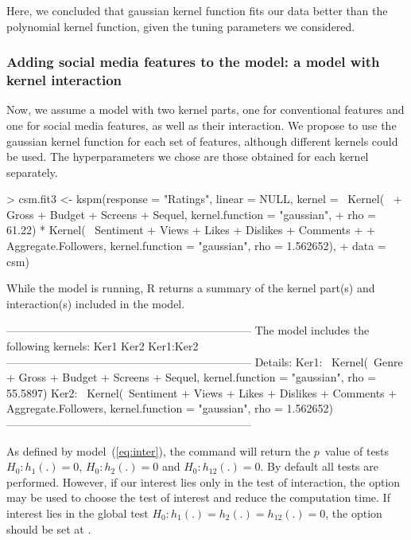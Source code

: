 Here, we concluded that gaussian kernel function fits our data better than the polynomial kernel function, given the tuning parameters we considered.

\subsubsection{Adding social media features to the model: a model with kernel interaction} \label{sec:illustrations-csm-model2}

Now, we assume a model with two kernel parts, one for conventional features and one for social media features, as well as their interaction. We propose to use the gaussian kernel function for each set of features, although different kernels could be used. The hyperparameters we chose are those obtained for each kernel separately.


\begin{example}
> csm.fit3 <- kspm(response = "Ratings", linear = NULL, kernel = ~Kernel(~ 
+    Gross + Budget + Screens + Sequel, kernel.function = "gaussian",
+    rho = 61.22) * Kernel(~ Sentiment + Views + Likes + Dislikes + Comments + 
+    Aggregate.Followers, kernel.function = "gaussian", rho = 1.562652),
+    data = csm)
\end{example}


While the model is running, R returns a summary of the kernel part(s) and interaction(s) included in the model.


\begin{example}
------------------------------------------------------------------ 
The model includes the following kernels:  
Ker1 
Ker2 
Ker1:Ker2
------------------------------------------------------------------ 
Details: 
Ker1: ~Kernel(~Genre + Gross + Budget + Screens + Sequel,
kernel.function = "gaussian", rho = 55.5897)
Ker2: ~Kernel(~Sentiment + Views + Likes + Dislikes + Comments +
Aggregate.Followers, kernel.function = "gaussian", rho = 1.562652)
------------------------------------------------------------------
\end{example}


As defined by model~(\ref{eq:inter}), the  command will return the $p$~value of tests $H_0: h_1(.) = 0$, $H_0: h_2(.) = 0$ and $H_0: h_{12}(.) = 0$. By default all tests are performed. However, if our interest lies only in the test of interaction, the  option may be used to choose the test of interest and reduce the computation time. If interest lies in the global test $H_0: h_1(.) = h_2(.) = h_{12}(.) = 0$, the  option should be set at .


